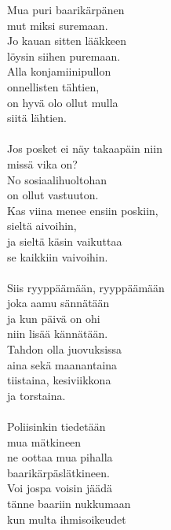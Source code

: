 
        Mua puri baarikärpänen \\
        mut miksi suremaan. \\
        Jo kauan sitten lääkkeen \\
        löysin siihen puremaan. \\
        Alla konjamiinipullon \\
        onnellisten tähtien, \\
        on hyvä olo ollut mulla \\
        siitä lähtien. \\
\hspace{10mm} \\
        Jos posket ei näy takaapäin niin \\
        missä vika on? \\
        No sosiaalihuoltohan \\
        on ollut vastuuton. \\
        Kas viina menee ensiin poskiin, \\
        sieltä aivoihin, \\
        ja sieltä käsin vaikuttaa \\
        se kaikkiin vaivoihin. \\
\hspace{10mm} \\
        Siis ryyppäämään, ryyppäämään \\
        joka aamu sännätään \\
        ja kun päivä on ohi \\
        niin lisää kännätään. \\
        Tahdon olla juovuksissa \\
        aina sekä maanantaina \\
        tiistaina, kesiviikkona \\
        ja torstaina. \\
\hspace{10mm} \\
        Poliisinkin tiedetään \\
        mua mätkineen \\
        ne oottaa mua pihalla \\
        baarikärpäslätkineen. \\
        Voi jospa voisin jäädä \\
        tänne baariin nukkumaan \\
        kun multa ihmisoikeudet \\
